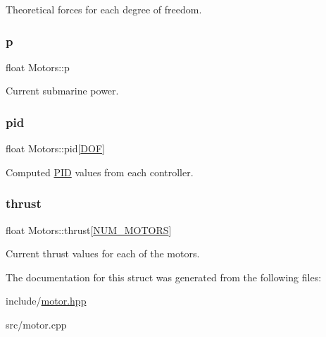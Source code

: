 Theoretical forces for each degree of freedom. \mbox{\label{structMotors_a46e39ac60edebef57fca46f878e2c0b5}} 
\subsubsection{\texorpdfstring{p}{p}}
{\footnotesize\ttfamily float Motors\+::p}

Current submarine power. \mbox{\label{structMotors_a94c46cb5dab8c60c9fae75cc6b7af629}} 
\subsubsection{\texorpdfstring{pid}{pid}}
{\footnotesize\ttfamily float Motors\+::pid\mbox{[}\hyperlink{config_8h_ab5c558d88abd9517fb657be4889ee1bc}{D\+OF}\mbox{]}}

Computed \hyperlink{structPID}{P\+ID} values from each controller. \mbox{\label{structMotors_ac8d20987287ffda85eed109c3bf80a12}} 
\subsubsection{\texorpdfstring{thrust}{thrust}}
{\footnotesize\ttfamily float Motors\+::thrust\mbox{[}\hyperlink{config_8h_ae84658f12c2f1b44f59af36678cf3dcc}{N\+U\+M\+\_\+\+M\+O\+T\+O\+RS}\mbox{]}}

Current thrust values for each of the motors. 

The documentation for this struct was generated from the following files\+:\begin{DoxyCompactItemize}
\item 
include/\hyperlink{motor_8hpp}{motor.\+hpp}\item 
src/motor.\+cpp\end{DoxyCompactItemize}
